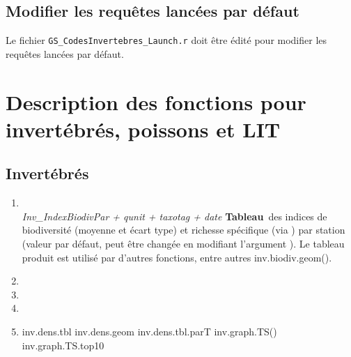 \documentclass{article}
\begin{document}
\subsection*{Modifier les requêtes lancées par défaut}
Le fichier \texttt{GS\_CodesInvertebres\_Launch.r} doit être édité
pour modifier les requêtes lancées par défaut.


\section{Description des fonctions pour invertébrés, poissons et LIT}
\subsection{Invertébrés}

\begin{enumerate}
  \item[]  \\
    \emph{Inv\_IndexBiodivPar + qunit + taxotag + date}
  \textbf{Tableau} des indices de biodiversité (moyenne et écart type)
  et richesse spécifique (via ) par station (valeur par défaut, peut être
  changée en modifiant l'argument ). Le tableau produit
  est utilisé par d'autres fonctions, entre autres inv.biodiv.geom().

  \item[] 
  \item[] 
  \item[] 
  \item[] 

  inv.dens.tbl
  inv.dens.geom
  inv.dens.tbl.parT
  inv.graph.TS()
  inv.graph.TS.top10

\end{enumerate}
\end{document}
